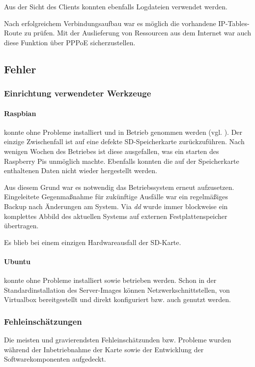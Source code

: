 		Aus der Sicht des Clients konnten ebenfalls Logdateien verwendet werden.

		Nach erfolgreichem Verbindungsaufbau war es möglich die vorhandene
		IP-Tables-Route zu prüfen. Mit der Auslieferung von Ressourcen aus
		dem Internet war auch diese Funktion über PPPoE sicherzustellen.

	\subsection{Fehler}
	\label{subsec:fehler}
		\subsubsection{Einrichtung verwendeter Werkzeuge}
			\paragraph{Raspbian} konnte ohne Probleme installiert und in
			Betrieb genommen werden (vgl. ). Der einzige Zwischenfall ist auf eine
			defekte SD-Speicherkarte zurückzuführen. Nach wenigen Wochen
			des Betriebes ist diese ausgefallen, was ein starten des
			Raspberry Pis unmöglich machte. Ebenfalls konnten die auf der
			Speicherkarte enthaltenen Daten nicht wieder hergestellt werden.

			Aus diesem Grund war es notwendig das Betriebssystem erneut aufzusetzen.
			Eingeleitete Gegenmaßnahme für zukünftige Ausfälle war ein regelmäßiges Backup
			nach Änderungen am System. Via \textit{dd} wurde immer blockweise ein komplettes Abbild
			des aktuellen Systems auf externen Festplattenspeicher übertragen.

			Es blieb bei einem einzigen Hardwareausfall der SD-Karte.

			\paragraph{Ubuntu} konnte ohne Probleme installiert sowie betrieben werden.
			Schon in der Standardinstallation des Server-Images können Netzwerkschnittstellen,
			von Virtualbox bereitgestellt und direkt konfiguriert bzw. auch genutzt werden.

		\subsubsection{Fehleinschätzungen}
		Die meisten und gravierendsten Fehleinschätzunden bzw. Probleme
		wurden während der Inbetriebnahme der Karte sowie der Entwicklung
		der Softwarekomponenten aufgedeckt.

